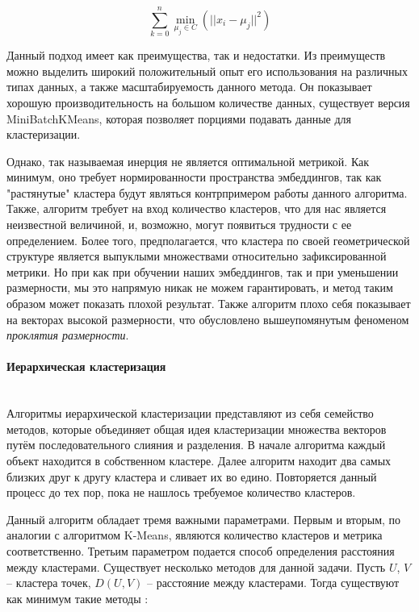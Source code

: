 $$
\sum_{k=0}^{n} \min_{\mu_j \in C}(||x_i - \mu_j||^2)
$$

\bigskip
\noindent
Данный подход имеет как преимущества, так и недостатки. Из преимуществ можно выделить широкий положительный опыт его использования на различных типах данных, а также масштабируемость данного метода. Он показывает хорошую производительность на большом количестве данных, существует версия MiniBatchKMeans, которая позволяет порциями подавать данные для кластеризации.

Однако, так называемая инерция не является оптимальной метрикой. Как минимум, оно требует нормированности пространства эмбеддингов, так как "растянутые" кластера будут являться контрпримером работы данного алгоритма. Также, алгоритм требует на вход количество кластеров, что для нас является неизвестной величиной, и, возможно, могут появиться трудности с ее определением. Более того, предполагается, что кластера по своей геометрической структуре является выпуклыми множествами относительно зафиксированной метрики. Но при как при обучении наших эмбеддингов, так и при уменьшении размерности, мы это напрямую никак не можем гарантировать, и метод таким образом может показать плохой результат. Также алгоритм плохо себя показывает на векторах высокой размерности, что обусловлено вышеупомянутым феноменом \textit{проклятия размерности}.

\paragraph{Иерархическая кластеризация}\mbox{} \\

Алгоритмы иерархической кластеризации представляют из себя семейство методов, которые объединяет общая идея кластеризации множества векторов путём последовательного слияния и разделения. В начале алгоритма каждый объект находится в собственном кластере. Далее алгоритм находит два самых близких друг к другу кластера и сливает их во едино. Повторяется данный процесс до тех пор, пока не нашлось требуемое количество кластеров.

Данный алгоритм обладает тремя важными параметрами. Первым и вторым, по аналогии с алгоритмом K-Means, являются количество кластеров и метрика соответственно. Третьим параметром подается способ определения расстояния между кластерами. Существует несколько методов для данной задачи. Пусть $U$, $V$ -- кластера точек, $D(U, V)$ -- расстояние между кластерами. Тогда существуют как минимум такие методы \cite{hierarchical}:

